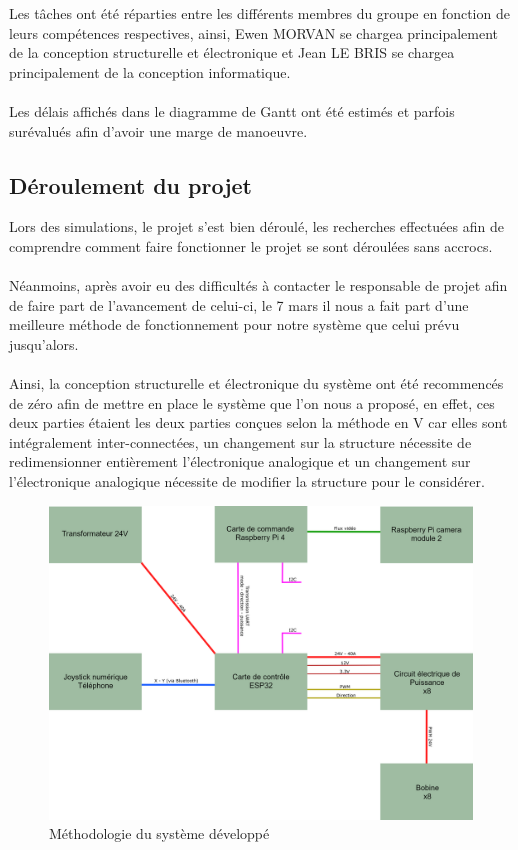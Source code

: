 \documentclass{article}
\begin{document}
        \noindent Les tâches ont été réparties entre les différents membres du groupe en fonction de leurs compétences respectives, ainsi, Ewen MORVAN se chargea principalement de la conception structurelle et électronique et Jean LE BRIS se chargea principalement de la conception informatique.
        \\\\
        Les délais affichés dans le diagramme de Gantt ont été estimés et parfois surévalués afin d'avoir une marge de manoeuvre.

    \subsection{Déroulement du projet}
        Lors des simulations, le projet s'est bien déroulé, les recherches effectuées afin de comprendre comment faire fonctionner le projet se sont déroulées sans accrocs.
        \\\\
        Néanmoins, après avoir eu des difficultés à contacter le responsable de projet afin de faire part de l'avancement de celui-ci, le 7 mars il nous a fait part d'une meilleure méthode de fonctionnement pour notre système que celui prévu jusqu'alors.
        \\\\
        Ainsi, la conception structurelle et électronique du système ont été recommencés de zéro afin de mettre en place le système que l'on nous a proposé, en effet, ces deux parties étaient les deux parties conçues selon la méthode en V car elles sont intégralement inter-connectées, un changement sur la structure nécessite de redimensionner entièrement l'électronique analogique et un changement sur l'électronique analogique nécessite de modifier la structure pour le considérer.
        
        \begin{figure}[H]
            \centering
                \includegraphics[width = 1\textwidth]{Images/system.png}
                \caption{Méthodologie du système développé}
                \label{fig:methodologie}
        \end{figure}
\end{document}
